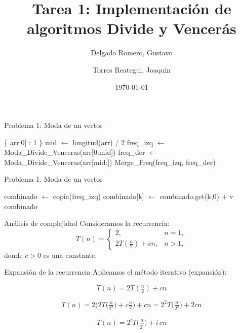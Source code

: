 \documentclass{beamer}
\title[Divide y vencerás]{Tarea 1: Implementación de algoritmos Divide y Vencerás}
\author[Delgado R. \and Torres R.]{Delgado Romero, Gustavo \inst{1} \and Torres Reategui, Joaquin\inst{2}}
\date{\today}
\begin{document}
\begin{frame}
  \titlepage
\end{frame}

\begin{frame}{Problema 1: Moda de un vector}
  \begin{algorithm}[H]
    \caption{Cálculo de la moda con Divide y Vencerás (Parte I)}
    \begin{algorithmic}[1]
          \State \Return \{ arr[0] : 1 \}
        \EndIf
        \State mid $\gets$ longitud(arr) / 2
        \State freq\_izq $\gets$ Moda\_Divide\_Venceras(arr[0:mid])
        \State freq\_der $\gets$ Moda\_Divide\_Venceras(arr[mid:])
        \State \Return Merge\_Freq(freq\_izq, freq\_der)
      \EndFunction
    \end{algorithmic}
  \end{algorithm}
\end{frame}

\begin{frame}{Problema 1: Moda de un vector}
  \begin{algorithm}[H]
    \caption{Cálculo de la moda con Divide y Vencerás (Parte II)}
    \begin{algorithmic}[1]
        \State combinado $\gets$ copia(freq\_izq)
          \State combinado[k] $\gets$ combinado.get(k,0) + v
        \EndFor
        \State \Return combinado
      \EndFunction
      
    \end{algorithmic}
  \end{algorithm}
\end{frame}

\begin{frame}{Análisis de complejidad}
Consideramos la recurrencia:
\[
T(n)=
\begin{cases}
2, & n=1, \\[6pt]
2T\!\left(\tfrac{n}{2}\right) + c n, & n>1,
\end{cases}
\]
donde \(c>0\) es una constante.

\bigskip

\end{frame}

\begin{frame}{Expansión de la recurrencia}
Aplicamos el método iterativo (expansión):

\[
T(n) = 2T\!\left(\tfrac{n}{2}\right) + cn
\]

\[
T(n) = 2\Big(2T\!\big(\tfrac{n}{2^2}\big) + c\tfrac{n}{2}\Big) + cn
      = 2^2T\!\big(\tfrac{n}{2^2}\big) + 2cn
\]

\[
T(n) = 2^iT\!\big(\tfrac{n}{2^i}\big) + i \, cn
\]
\end{frame}
\end{document}
